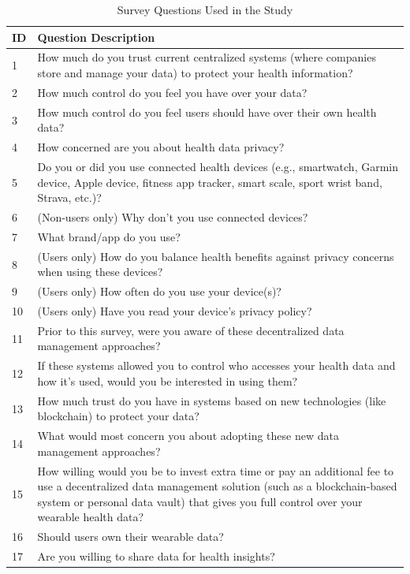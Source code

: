 	\begin{table}[ht]
		\caption{Survey Questions Used in the Study}
		\centering
		\begin{tabular}{p{1.5cm} p{13cm}}
			\toprule
			\textbf{ID} & \textbf{Question Description} \\
			\midrule
			1 & How much do you trust current centralized systems (where companies store and manage your data) to protect your health information? \\
			2 & How much control do you feel you have over your data? \\
			3 & How much control do you feel users should have over their own health data? \\
			4 & How concerned are you about health data privacy? \\
			5 & Do you or did you use connected health devices (e.g., smartwatch, Garmin device, Apple device, fitness app tracker, smart scale, sport wrist band, Strava, etc.)? \\
			6 & (Non-users only) Why don’t you use connected devices? \\
			7 & What brand/app do you use? \\
			8 & (Users only) How do you balance health benefits against privacy concerns when using these devices? \\
			9 & (Users only) How often do you use your device(s)? \\
			10 & (Users only) Have you read your device’s privacy policy? \\
			11 & Prior to this survey, were you aware of these decentralized data management approaches? \\
			12 & If these systems allowed you to control who accesses your health data and how it's used, would you be interested in using them? \\
			13 & How much trust do you have in systems based on new technologies (like blockchain) to protect your data? \\
			14 & What would most concern you about adopting these new data management approaches? \\
			15 & How willing would you be to invest extra time or pay an additional fee to use a decentralized data management solution (such as a blockchain-based system or personal data vault) that gives you full control over your wearable health data? \\
			16 & Should users own their wearable data? \\
			17 & Are you willing to share data for health insights? \\

\end{tabular}
\end{table}
